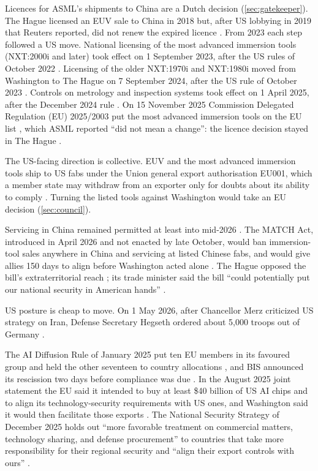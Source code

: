 Licences for ASML's shipments to China are a Dutch decision (\cref{sec:gatekeeper}). The Hague licensed an EUV sale to China in 2018 but, after US lobbying in 2019 that Reuters reported, did not renew the expired licence \citep{nltimes2020pressured, kaag2020asml}. From 2023 each step followed a US move. National licensing of the most advanced immersion tools (NXT:2000i and later) took effect on 1 September 2023, after the US rules of October 2022 \citep{govnl2023controls}. Licensing of the older NXT:1970i and NXT:1980i moved from Washington to The Hague on 7 September 2024, after the US rule of October 2023 \citep{stcrt2024duv, asml2024license}. Controls on metrology and inspection systems took effect on 1 April 2025, after the December 2024 rule \citep{stcrt2025metrology}. On 15 November 2025 Commission Delegated Regulation (EU) 2025/2003 put the most advanced immersion tools on the EU list \citep{eu2025dualuse}, which ASML reported ``did not mean a change'': the licence decision stayed in The Hague \citep{asml2026annual}.

The US-facing direction is collective. EUV and the most advanced immersion tools ship to US fabs under the Union general export authorisation EU001, which a member state may withdraw from an exporter only for doubts about its ability to comply \citep{eu2021dualuse}. Turning the listed tools against Washington would take an EU decision (\cref{sec:council}).

Servicing in China remained permitted at least into mid-2026 \citep{zakaria2026match}. The MATCH Act, introduced in April 2026 and not enacted by late October, would ban immersion-tool sales anywhere in China and servicing at listed Chinese fabs, and would give allies 150 days to align before Washington acted alone \citep{baumgartner2026match, hr8170}. The Hague opposed the bill's extraterritorial reach \citep{tk2026match}; its trade minister said the bill ``could potentially put our national security in American hands'' \citep{nltimes2026irritated}.

US posture is cheap to move. On 1 May 2026, after Chancellor Merz criticized US strategy on Iran, Defense Secretary Hegseth ordered about 5,000 troops out of Germany \citep{martinez2026germany}.

The AI Diffusion Rule of January 2025 put ten EU members in its favoured group and held the other seventeen to country allocations \citep{bis2025diffusion}, and BIS announced its rescission two days before compliance was due \citep{bis2025rescission}. In the August 2025 joint statement the EU said it intended to buy at least \$40 billion of US AI chips and to align its technology-security requirements with US ones, and Washington said it would then facilitate those exports \citep{whitehouse2025jointstatement}. The National Security Strategy of December 2025 holds out ``more favorable treatment on commercial matters, technology sharing, and defense procurement'' to countries that take more responsibility for their regional security and ``align their export controls with ours'' \citep{whitehouse2025nss}.

